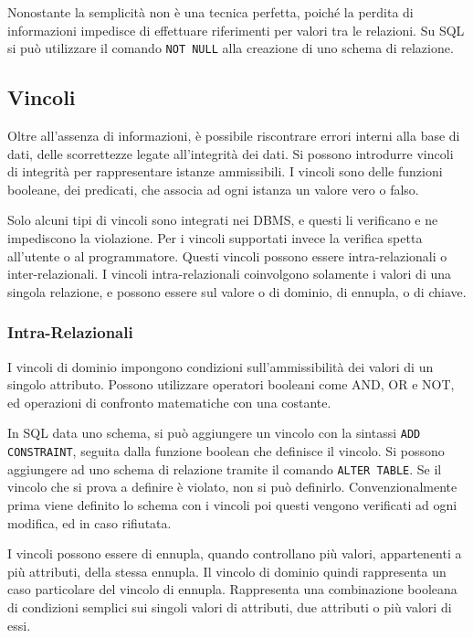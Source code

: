 \documentclass{article}
\numberwithin{equation}{subsection}
\begin{document}
Nonostante la semplicità non è una tecnica perfetta, poiché la perdita di informazioni impedisce di effettuare riferimenti per valori tra le relazioni. 
Su SQL si può utilizzare il comando \verb|NOT NULL| alla creazione di uno schema di relazione. 

\subsection{Vincoli}

Oltre all'assenza di informazioni, è possibile riscontrare errori interni alla base di dati, delle scorrettezze legate all'integrità dei dati. Si possono introdurre 
vincoli di integrità per rappresentare istanze ammissibili. I vincoli sono delle funzioni booleane, dei predicati, che associa ad ogni istanza un valore vero o falso. 

Solo alcuni tipi di vincoli sono integrati nei DBMS, e questi li verificano e ne impediscono la violazione. Per i vincoli supportati invece la verifica spetta all'utente 
o al programmatore. 
Questi vincoli possono essere intra-relazionali o inter-relazionali. I vincoli intra-relazionali coinvolgono solamente i valori di una singola relazione, e possono 
essere sul valore o di dominio, di ennupla, o di chiave. 

\subsubsection{Intra-Relazionali}

I vincoli di dominio impongono condizioni sull'ammissibilità dei valori di un singolo attributo. 
Possono utilizzare operatori booleani come AND, OR e NOT, ed operazioni di confronto matematiche con una costante. 

In SQL data uno schema, si può aggiungere un vincolo con la sintassi \verb|ADD CONSTRAINT|, seguita dalla funzione boolean che definisce il vincolo. Si possono 
aggiungere ad uno schema di relazione tramite il comando \verb|ALTER TABLE|. Se il vincolo che si prova a definire è violato, non si può definirlo. Convenzionalmente 
prima viene definito lo schema con i vincoli poi questi vengono verificati ad ogni modifica, ed in caso rifiutata. 

I vincoli possono essere di ennupla, quando controllano più valori, appartenenti a più attributi, della stessa ennupla. Il vincolo di dominio quindi rappresenta un 
caso particolare del vincolo di ennupla. Rappresenta una combinazione booleana di condizioni semplici sui singoli valori di attributi, due attributi o più valori di essi. 
\end{document}
